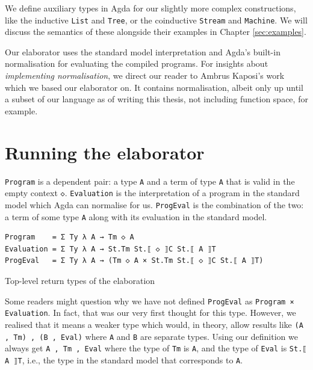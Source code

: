 We define auxiliary types in Agda for our slightly more complex constructions, like the inductive \verb$List$ and \verb$Tree$, or the coinductive \verb$Stream$ and \verb$Machine$. We will discuss the semantics of these alongside their examples in Chapter \ref{sec:examples}.

Our elaborator uses the standard model interpretation and Agda's built-in normalisation for evaluating the compiled programs. For insights about \textit{implementing normalisation}, we direct our reader to Ambrus Kaposi's work \cite{typesystems-repo} which we based our elaborator on. It contains normalisation, albeit only up until a subset of our language as of writing this thesis, not including function space, for example.

\section{Running the elaborator} \label{sec:running}

\verb$Program$ is a dependent pair: a type \verb$A$ and a term of type \verb$A$ that is valid in the empty context \verb$◇$. \verb$Evaluation$ is the interpretation of a program in the standard model which Agda can normalise for us. \verb$ProgEval$ is the combination of the two: a term of some type \verb$A$ along with its evaluation in the standard model.

\begin{listing}[H]
\begin{verbatim}
Program    = Σ Ty λ A → Tm ◇ A
Evaluation = Σ Ty λ A → St.Tm St.⟦ ◇ ⟧C St.⟦ A ⟧T
ProgEval   = Σ Ty λ A → (Tm ◇ A × St.Tm St.⟦ ◇ ⟧C St.⟦ A ⟧T)
\end{verbatim}
\caption{Top-level return types of the elaboration}
\label{code:elab-types}
\end{listing}

Some readers might question why we have not defined \verb$ProgEval$ as \verb$Program × Evaluation$. In fact, that was our very first thought for this type. However, we realised that it means a weaker type which would, in theory, allow results like \verb$(A , Tm) , (B , Eval)$ where \verb$A$ and \verb$B$ are separate types. Using our definition we always get \verb$A , Tm , Eval$ where the type of \verb$Tm$ is \verb$A$, and the type of \verb$Eval$ is \verb$St.⟦ A ⟧T$, i.e., the type in the standard model that corresponds to \verb$A$.

